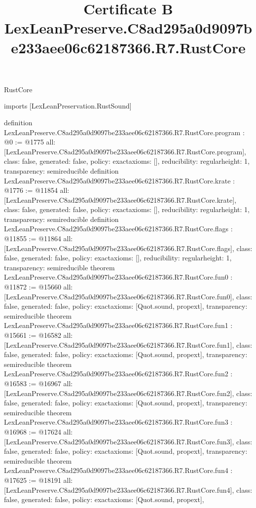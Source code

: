 \begin{lexlean}{RustCore}
\title{Certificate B LexLeanPreserve.C8ad295a0d9097be233aee06c62187366.R7.RustCore}
\begin{coremodule}
imports [LexLeanPreservation.RustSound]

definition LexLeanPreserve.C8ad295a0d9097be233aee06c62187366.R7.RustCore.program : @0 := @1775 {
  all: [LexLeanPreserve.C8ad295a0d9097be233aee06c62187366.R7.RustCore.program],
  class: false,
  generated: false,
  policy: exact{axioms: []},
  reducibility: regular{height: 1},
  transparency: semireducible
}
definition LexLeanPreserve.C8ad295a0d9097be233aee06c62187366.R7.RustCore.krate : @1776 := @11854 {
  all: [LexLeanPreserve.C8ad295a0d9097be233aee06c62187366.R7.RustCore.krate],
  class: false,
  generated: false,
  policy: exact{axioms: []},
  reducibility: regular{height: 1},
  transparency: semireducible
}
definition LexLeanPreserve.C8ad295a0d9097be233aee06c62187366.R7.RustCore.flags : @11855 := @11864 {
  all: [LexLeanPreserve.C8ad295a0d9097be233aee06c62187366.R7.RustCore.flags],
  class: false,
  generated: false,
  policy: exact{axioms: []},
  reducibility: regular{height: 1},
  transparency: semireducible
}
theorem LexLeanPreserve.C8ad295a0d9097be233aee06c62187366.R7.RustCore.fun0 : @11872 := @15660 {
  all: [LexLeanPreserve.C8ad295a0d9097be233aee06c62187366.R7.RustCore.fun0],
  class: false,
  generated: false,
  policy: exact{axioms: [Quot.sound, propext]},
  transparency: semireducible
}
theorem LexLeanPreserve.C8ad295a0d9097be233aee06c62187366.R7.RustCore.fun1 : @15661 := @16582 {
  all: [LexLeanPreserve.C8ad295a0d9097be233aee06c62187366.R7.RustCore.fun1],
  class: false,
  generated: false,
  policy: exact{axioms: [Quot.sound, propext]},
  transparency: semireducible
}
theorem LexLeanPreserve.C8ad295a0d9097be233aee06c62187366.R7.RustCore.fun2 : @16583 := @16967 {
  all: [LexLeanPreserve.C8ad295a0d9097be233aee06c62187366.R7.RustCore.fun2],
  class: false,
  generated: false,
  policy: exact{axioms: [Quot.sound, propext]},
  transparency: semireducible
}
theorem LexLeanPreserve.C8ad295a0d9097be233aee06c62187366.R7.RustCore.fun3 : @16968 := @17624 {
  all: [LexLeanPreserve.C8ad295a0d9097be233aee06c62187366.R7.RustCore.fun3],
  class: false,
  generated: false,
  policy: exact{axioms: [Quot.sound, propext]},
  transparency: semireducible
}
theorem LexLeanPreserve.C8ad295a0d9097be233aee06c62187366.R7.RustCore.fun4 : @17625 := @18191 {
  all: [LexLeanPreserve.C8ad295a0d9097be233aee06c62187366.R7.RustCore.fun4],
  class: false,
  generated: false,
  policy: exact{axioms: [Quot.sound, propext]},
}
\end{coremodule}
\end{lexlean}
